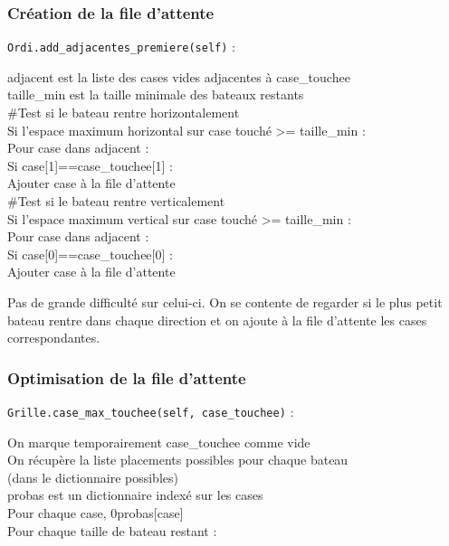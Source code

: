 \subsubsection{Création de la file d'attente}
\texttt{Ordi.add\_adjacentes\_premiere(self)} :
\begin{algo1}
adjacent est la liste des cases vides adjacentes à case\_touchee\\
taille\_min est la taille minimale des bateaux restants\\
\#Test si le bateau rentre horizontalement\\
Si l'espace maximum horizontal sur case touché >= taille\_min :\\
Pour case dans adjacent :\\
Si case[1]==case\_touchee[1] :\\
Ajouter case à la file d'attente\\
\#Test si le bateau rentre verticalement\\
Si l'espace maximum vertical sur case touché >= taille\_min :\\
Pour case dans adjacent :\\
Si case[0]==case\_touchee[0] :\\
Ajouter case à la file d'attente\\
\end{algo1}

Pas de grande difficulté sur celui-ci. On se contente de regarder si le plus petit bateau rentre dans chaque direction et on ajoute à la file d'attente les cases correspondantes.

\subsubsection{Optimisation de la file d'attente}
\texttt{Grille.case\_max\_touchee(self, case\_touchee)} :
\begin{algo1}
On marque temporairement case\_touchee comme vide\\ 
On récupère la liste placements possibles pour chaque bateau\\
 (dans le dictionnaire possibles)\\
probas est un dictionnaire indexé sur les cases\\
Pour chaque case, 0\sto probas[case]\\
Pour chaque taille de bateau restant :\\
\end{algo1}

